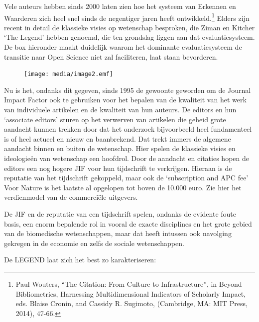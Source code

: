 \documentclass[empirical, authordate, ]{new-jote-article}
\begin{document}
	Vele auteurs hebben sinds 2000 laten zien hoe het systeem van Erkennen en Waarderen zich heel snel sinds de negentiger jaren heeft ontwikkeld.\footnote{Paul Wouters, “The Citation: From Culture to Infrastructure”, in Beyond Bibliometrics, Harnessing Multidimensional Indicators of Scholarly Impact, eds. Blaise Cronin, and Cassidy R. Sugimoto, (Cambridge, MA: MIT Press, 2014), 47-66. } Elders zijn recent in detail de klassieke visies op wetenschap besproken, die Ziman en Kitcher ‘The Legend' hebben genoemd, die ten grondslag liggen aan dat evaluatiesysteem. De box hieronder maakt duidelijk waarom het dominante evaluatiesysteem de transitie naar Open Science niet zal faciliteren, laat staan bevorderen.



	\begin{figure}
		\texttt{[image: media/image2.emf]}

		\caption{}

		\label{fig:rId17}


	\end{figure}



	Nu is het, ondanks dit gegeven, sinds 1995 de gewoonte geworden om de Journal Impact Factor ook te gebruiken voor het bepalen van de kwaliteit van het werk van individuele artikelen en de kwaliteit van hun auteurs. De editors en hun ‘associate editors' sturen op het verwerven van artikelen die geheid grote aandacht kunnen trekken door dat het onderzoek bijvoorbeeld heel fundamenteel is of heel actueel en nieuw en baanbrekend. Dat trekt immers de algemene aandacht binnen en buiten de wetenschap. Hier spelen de klassieke visies en ideologieën van wetenschap een hoofdrol. Door de aandacht en citaties hopen de editors een nog hogere JIF voor hun tijdschrift te verkrijgen. Hieraan is de reputatie van het tijdschrift gekoppeld, maar ook de ‘subscription and APC fee' Voor Nature is het laatste al opgelopen tot boven de 10.000 euro. Zie hier het verdienmodel van de commerciële uitgevers.



	De JIF en de reputatie van een tijdschrift spelen, ondanks de evidente foute basis, een enorm bepalende rol in vooral de exacte disciplines en het grote gebied van de biomedische wetenschappen, maar dat heeft intussen ook navolging gekregen in de economie en zelfs de sociale wetenschappen.



	De LEGEND laat zich het best zo karakteriseren:
\end{document}
